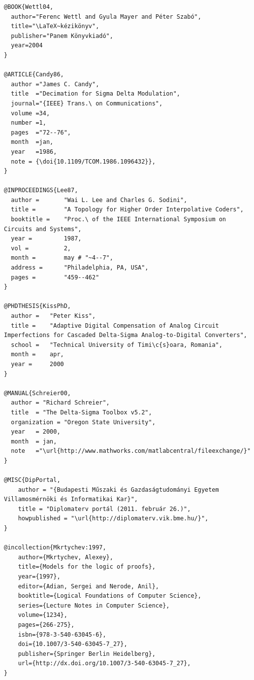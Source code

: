 \begin{lstlisting}[caption=Példa szöveges irodalomjegyzék-adatbázisra BiBTeX használata esetén.,label=listing:Bibtex]
@BOOK{Wettl04,
  author="Ferenc Wettl and Gyula Mayer and Péter Szabó",
  title="\LaTeX~kézikönyv",
  publisher="Panem Könyvkiadó",
  year=2004
}

@ARTICLE{Candy86,
  author ="James C. Candy",
  title  ="Decimation for Sigma Delta Modulation",
  journal="{IEEE} Trans.\ on Communications",
  volume =34,
  number =1,
  pages  ="72--76",
  month  =jan,
  year   =1986,
  note = {\doi{10.1109/TCOM.1986.1096432}},
}

@INPROCEEDINGS{Lee87,
  author =       "Wai L. Lee and Charles G. Sodini",
  title =        "A Topology for Higher Order Interpolative Coders",
  booktitle =    "Proc.\ of the IEEE International Symposium on Circuits and Systems",
  year =         1987,
  vol =          2,
  month =        may # "~4--7",
  address =      "Philadelphia, PA, USA",
  pages =        "459--462"
}

@PHDTHESIS{KissPhD,
  author =   "Peter Kiss",
  title =    "Adaptive Digital Compensation of Analog Circuit Imperfections for Cascaded Delta-Sigma Analog-to-Digital Converters",
  school =   "Technical University of Timi\c{s}oara, Romania",
  month =    apr,
  year =     2000
}

@MANUAL{Schreier00,
  author = "Richard Schreier",
  title  = "The Delta-Sigma Toolbox v5.2",
  organization = "Oregon State University",
  year   = 2000,
  month  = jan,
  note   ="\url{http://www.mathworks.com/matlabcentral/fileexchange/}"
}

@MISC{DipPortal,
	author = "{Budapesti Műszaki és Gazdaságtudományi Egyetem Villamosmérnöki és Informatikai Kar}",
	title = "Diplomaterv portál (2011. február 26.)",
	howpublished = "\url{http://diplomaterv.vik.bme.hu/}",
}

@incollection{Mkrtychev:1997,
	author={Mkrtychev, Alexey},
	title={Models for the logic of proofs},
	year={1997},
	editor={Adian, Sergei and Nerode, Anil},
	booktitle={Logical Foundations of Computer Science},
	series={Lecture Notes in Computer Science},
	volume={1234},
	pages={266-275},
	isbn={978-3-540-63045-6},
	doi={10.1007/3-540-63045-7_27},
	publisher={Springer Berlin Heidelberg},
	url={http://dx.doi.org/10.1007/3-540-63045-7_27},
}
\end{lstlisting}

